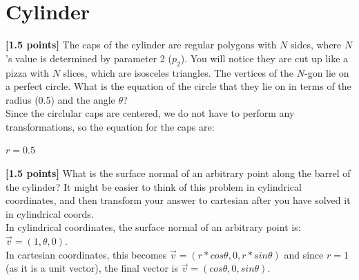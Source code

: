 \documentclass[10pt,twocolumn]{article}
\begin{document}
\section{Cylinder}
{\bf [1.5 points]} The caps of the cylinder are regular polygons with $N$ sides, where $N$'s value is determined by parameter 2 ($p_2$). You will notice they are cut up like a pizza with $N$ slices, which are isosceles triangles. The vertices of the $N$-gon lie on a perfect circle. What is the equation of the circle that they lie on  in terms of the radius (0.5) and the angle $\theta$?
\vspace{2em}\\
Since the circlular caps are centered, we do not have to perform any transformations, so the equation for the caps are:

$r = 0.5$

\vspace{2em}
{\bf [1.5 points]} What is the surface normal of an arbitrary point along the barrel of the cylinder? It might be easier to think of this problem in cylindrical coordinates, and then transform your answer to cartesian after you have solved it in cylindrical coords.
\vspace{2em} \\
In cylindrical coordinates, the surface normal of an arbitrary point is: $\vec{v} = (1, \theta, 0)$. \\
In cartesian coordinates, this becomes $\vec{v} = (r*cos\theta, 0, r*sin\theta)$ and since $r = 1$ (as it is a unit vector), the final vector is $\vec{v} = (cos\theta, 0, sin\theta)$.
\vspace{2em}
\end{document}
